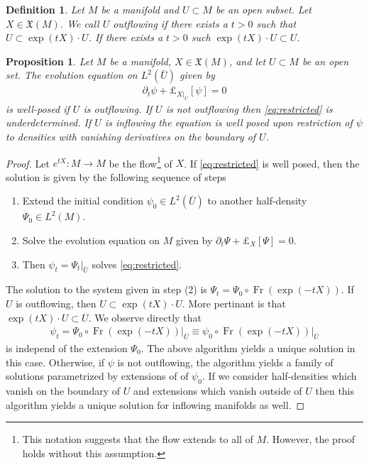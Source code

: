\documentclass[12pt]{amsart}
\newtheorem{prop}{Proposition}
\newtheorem{defn}{Definition}
\DeclareMathOperator{\Fr}{Fr}
\begin{document}
\begin{defn}
  Let $M$ be a manifold and $U \subset M$ be an open subset.
  Let $X \in \mathfrak{X}(M)$.
  We call $U$ \emph{outflowing} if there exists a $t > 0$
  such that $U \subset \exp(t X) \cdot U$.
  If there exists a $t>0$ such $\exp(t X) \cdot U \subset U$.
\end{defn}

\begin{prop}
  Let $M$ be a manifold, $X \in \mathfrak{X}(M)$, and let $U \subset M$ be an open set.  The evolution equation on $L^2(\bar{U})$ given by
  \begin{align}
    \partial_t \psi + \pounds_{X|_{\bar{U}}}[\psi] = 0 \label{eq:restricted}
  \end{align}
  is well-posed if $U$ is outflowing.
  If $U$ is not outflowing then \eqref{eq:restricted} is underdetermined.
  If $U$ is inflowing the equation is well posed upon restriction of $\psi$ to densities with vanishing derivatives on the boundary of $U$.
\end{prop}
\begin{proof}
  Let $e^{tX}:M \to M$ be the flow\footnote{This notation suggests that the flow extends to all of $M$. However, the proof holds without this assumption.} of $X$.
  If \eqref{eq:restricted} is well posed, then the solution is given by the following sequence of steps
  \begin{enumerate}
    \item Extend the initial condition $\psi_0 \in L^2( \bar{U})$ to another half-density $\Psi_0 \in L^2(M)$.
    \item Solve the evolution equation on $M$ given by $\partial_t \Psi + \pounds_X[\Psi] = 0$.
    \item Then $\psi_t = \Psi_t |_{\bar{U}}$ solves \eqref{eq:restricted}.
  \end{enumerate}
  The solution to the system given in step (2) is $\Psi_t = \Psi_0 \circ \Fr( \exp( -tX) )$.
  If $U$ is outflowing, then $U \subset \exp(tX) \cdot U$.
  More pertinant is that $\exp(tX) \cdot U \subset U$.
  We observe directly that
  \begin{align*}
    \psi_t = \left. \Psi_0 \circ \Fr( \exp( -tX) ) \right|_{\bar{U}}
    \equiv \psi_0 \circ \Fr( \exp(-tX) ) |_{\bar{U}}
  \end{align*}
  is independ of the extension $\Psi_0$.
  The above algorithm yields a unique solution in this case.
  Otherwise, if $\psi$ is not outflowing, the algorithm yields a
  family of solutions parametrized by extensions of of $\psi_0$.
  If we consider half-densities which vanish on the boundary of $U$ and extensions which vanish outside of $U$ then this algorithm yields a unique solution for inflowing manifolds as well.
\end{proof}
\end{document}
